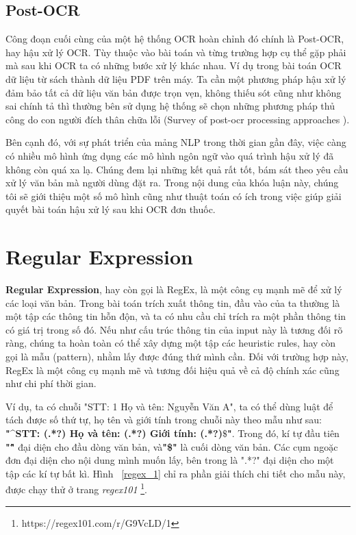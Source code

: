 \subsection{Post-OCR}

Công đoạn cuối cùng của một hệ thống OCR hoàn chỉnh đó chính là Post-OCR, hay hậu xử
lý OCR. Tùy thuộc vào bài toán và từng trường hợp cụ thể gặp phải mà sau khi OCR ta có
những bước xử lý khác nhau. Ví dụ trong bài toán OCR dữ liệu từ sách thành dữ liệu PDF
trên máy. Ta cần một phương pháp hậu xử lý đảm bảo tất cả dữ liệu văn bản được trọn vẹn,
không thiếu sót cũng như không sai chính tả thì thường bên sử dụng hệ thống sẽ chọn
những phương pháp thủ công do con người đích thân chữa lỗi (Survey of post-ocr processing approaches \cite{nguyen2021survey}).

Bên cạnh đó, với sự phát triển của mảng NLP trong thời gian gần đây, việc càng có nhiều
mô hình ứng dụng các mô hình ngôn ngữ vào quá trình hậu xử lý đã không còn quá xa lạ.
Chúng đem lại những kết quả rất tốt, bám sát theo yêu cầu xử lý văn bản mà người dùng
đặt ra. Trong nội dung của khóa luận này, chúng tôi sẽ giới thiệu một số mô hình cũng như
thuật toán có ích trong việc giúp giải quyết bài toán hậu xử lý sau khi OCR đơn thuốc.

\section{Regular Expression}

\textbf{Regular Expression}, hay còn gọi là RegEx, là một công cụ mạnh mẽ để xử lý các loại văn bản. Trong bài toán trích xuất thông tin, đầu vào của ta thường là một tập các thông tin hỗn độn, và ta có nhu cầu chỉ trích ra một phần thông tin có giá trị trong số đó. Nếu như cấu trúc thông tin của input này là tương đối rõ ràng, chúng ta hoàn toàn có thể xây dựng một tập các heuristic rules, hay còn gọi là mẫu (pattern), nhằm lấy được đúng thứ mình cần. Đối với trường hợp này, RegEx là một công cụ mạnh mẽ và tương đối hiệu quả về cả độ chính xác cũng như chi phí thời gian.

Ví dụ, ta có chuỗi "STT: 1 Họ và tên: Nguyễn Văn A", ta có thể dùng luật để tách được số thứ tự, họ tên và giới tính trong chuỗi này theo mẫu như sau: \textbf{"^STT: (.*?) Họ và tên: (.*?) Giới tính: (.*?)$\$$"}. Trong đó, kí tự đầu tiên \textbf{"\^"} đại diện cho đầu dòng văn bản, và\textbf{"\$"} là cuối dòng văn bản. Các cụm ngoặc đơn đại diện cho nội dung mình muốn lấy, bên trong là ".*?" đại diện cho một tập các kí tự bất kì. Hình ~\ref{regex_1} chỉ ra phần giải thích chi tiết cho mẫu này, được chạy thử ở trang \textit{regex101} \footnote{https://regex101.com/r/G9VcLD/1}.

